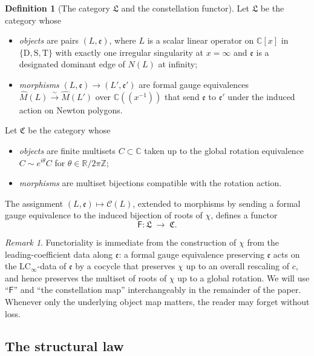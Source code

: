 \documentclass[aip,jmp,preprint,amsmath,amssymb,nofootinbib,floatfix]{revtex4-2}
\theoremstyle{plain}
\theoremstyle{definition}
\newtheorem{definition}[theorem]{Definition}
\theoremstyle{remark}
\newtheorem{remark}[theorem]{Remark}
\newcommand{\opD}{\mathrm{D}}                     %
\newcommand{\opS}{\mathrm{S}}                     %
\newcommand{\opT}{\mathrm{T}}                     %
\newcommand{\LCinf}{\mathrm{LC}_\infty}
\newcommand{\NL}{N(L)}
\newcommand{\Cl}{\mathcal{C}}
\newcommand{\Fclass}{\mathsf{F}}
\begin{document}
\begin{definition}[The category $\mathfrak{L}$ and the constellation
functor]\label{def:F-functor}
Let $\mathfrak{L}$ be the category whose
\begin{itemize}[leftmargin=2em]
\item \emph{objects} are pairs $(L, \mathfrak{e})$, where $L$ is a
scalar linear operator on $\mathbb{C}[x]$ in $\{\opD, \opS, \opT\}$
with exactly one irregular singularity at $x = \infty$ and
$\mathfrak{e}$ is a designated dominant edge of $\NL$ at infinity;
\item \emph{morphisms} $(L, \mathfrak{e}) \to (L', \mathfrak{e}')$
are formal gauge equivalences $\widehat{M}(L) \xrightarrow{\sim}
\widehat{M}(L')$ over $\mathbb{C}((x^{-1}))$ that send
$\mathfrak{e}$ to $\mathfrak{e}'$ under the induced action on Newton
polygons.
\end{itemize}
Let $\mathfrak{C}$ be the category whose
\begin{itemize}[leftmargin=2em]
\item \emph{objects} are finite multisets $C \subset \mathbb{C}$
taken up to the global rotation equivalence
$C \sim e^{i\theta} C$ for $\theta \in \mathbb{R}/2\pi\mathbb{Z}$;
\item \emph{morphisms} are multiset bijections compatible with the
rotation action.
\end{itemize}
The assignment $(L, \mathfrak{e}) \mapsto \Cl(L)$, extended to morphisms
by sending a formal gauge equivalence to the induced bijection of
roots of $\chi$, defines a functor
\[
   \Fclass \colon \mathfrak{L} \;\longrightarrow\; \mathfrak{C}.
\]
\end{definition}

\begin{remark}\label{rem:F-functoriality}
Functoriality is immediate from the construction of $\chi$ from the
leading-coefficient data along $\mathfrak{e}$: a formal gauge
equivalence preserving $\mathfrak{e}$ acts on the $\LCinf$-data of
$\mathfrak{e}$ by a cocycle that preserves $\chi$ up to an overall
rescaling of $c$, and hence preserves the multiset of roots of $\chi$
up to a global rotation. We will use ``$\Fclass$'' and ``the
constellation map'' interchangeably in the remainder of the paper.
Whenever only the underlying object map matters, the reader may
forget  without loss.
\end{remark}

\subsection{The structural law}\label{ssec:intro-law}
\end{document}
